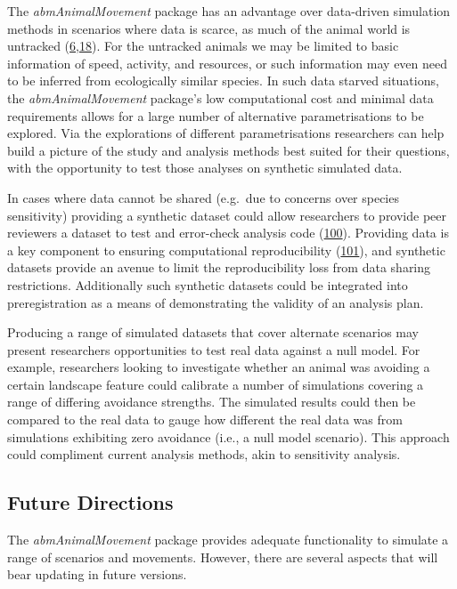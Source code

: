 \documentclass[10pt,a4paper]{article}
\begin{document}
The \emph{abmAnimalMovement} package has an advantage over data-driven simulation methods in scenarios where data is scarce, as much of the animal world is untracked (\protect\hyperlink{ref-joo_recent_2022}{6},\protect\hyperlink{ref-crane_lots_2021}{18}).
For the untracked animals we may be limited to basic information of speed, activity, and resources, or such information may even need to be inferred from ecologically similar species.
In such data starved situations, the \emph{abmAnimalMovement} package's low computational cost and minimal data requirements allows for a large number of alternative parametrisations to be explored.
Via the explorations of different parametrisations researchers can help build a picture of the study and analysis methods best suited for their questions, with the opportunity to test those analyses on synthetic simulated data.

In cases where data cannot be shared (e.g.~due to concerns over species sensitivity) providing a synthetic dataset could allow researchers to provide peer reviewers a dataset to test and error-check analysis code (\protect\hyperlink{ref-Quintana2020}{100}).
Providing data is a key component to ensuring computational reproducibility (\protect\hyperlink{ref-Gerstner2017}{101}), and synthetic datasets provide an avenue to limit the reproducibility loss from data sharing restrictions.
Additionally such synthetic datasets could be integrated into preregistration as a means of demonstrating the validity of an analysis plan.

Producing a range of simulated datasets that cover alternate scenarios may present researchers opportunities to test real data against a null model.
For example, researchers looking to investigate whether an animal was avoiding a certain landscape feature could calibrate a number of simulations covering a range of differing avoidance strengths.
The simulated results could then be compared to the real data to gauge how different the real data was from simulations exhibiting zero avoidance (i.e., a null model scenario).
This approach could compliment current analysis methods, akin to sensitivity analysis.

\hypertarget{future-directions}{%
\subsection{Future Directions}\label{future-directions}}

The \emph{abmAnimalMovement} package provides adequate functionality to simulate a range of scenarios and movements.
However, there are several aspects that will bear updating in future versions.
\end{document}
